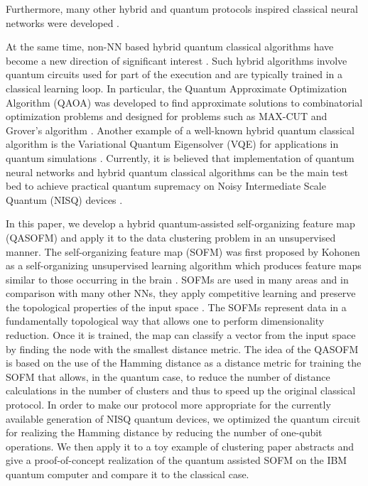 \documentclass[pra,showkeys,twocolumn,showpacs,aps,10pt]{revtex4-2}
\begin{document}
Furthermore, many other hybrid and quantum protocols inspired classical neural networks were developed  \cite{kolleQuantumDenoisingDiffusion2024,li2019, Heese2022,killoran2019,bondarenko2019,dunjko2017,nautrup2019,foesel2018, rebentrost2018,purushothaman1997,verdon2019,cherny2019,byrnes2013,mishra2019, pyrkov2019, vinci2019, lu2019,mohseni2023deep,mohseni2024deep}.

At the same time, non-NN based hybrid quantum classical algorithms have become a new direction of significant interest \cite{mcclean2016,arute2020,akshay2020}.
Such hybrid algorithms involve quantum circuits used for part of the execution and are typically trained in a classical learning loop.
In particular, the Quantum Approximate Optimization Algorithm (QAOA) was developed to find approximate solutions to combinatorial optimization problems \cite{farhi2014,farhi2016}
and designed for problems such as MAX-CUT and Grover's algorithm \cite{arute2020,akshay2020,wang2018,jiang2017,huang2019,wecker2016,pagano2019,byrnes2018,liao2021quadratic}.
Another example of a well-known hybrid quantum classical algorithm is the Variational Quantum Eigensolver (VQE) for applications in quantum simulations
\cite{kandala2017,aspuru-guzik2005,lanyon2010,peruzzo2014}.
Currently, it is believed that implementation of quantum neural networks and hybrid quantum classical algorithms can be the main test bed to achieve practical quantum supremacy on Noisy Intermediate Scale Quantum (NISQ) devices \cite{preskill2018,Bharti2022,Cerezo2021}.

In this paper, we develop a hybrid quantum-assisted self-organizing feature map (QASOFM)
and apply it to the data clustering problem in an unsupervised manner. The self-organizing feature map (SOFM) was first proposed by Kohonen \cite{kohonen1990,kohonen1996,kohonen1997} as a self-organizing unsupervised learning algorithm which produces feature maps similar to those occurring in the brain \cite{solan2001}. SOFMs are used in many areas \cite{vilibic2016, guido1998, doszkocs1990, jones2012,mori2019,corsello2017,zhu2018,chea2016}
and in comparison with many other NNs, they apply competitive learning and preserve the topological properties of the input space \cite{kiviluotoa1996}.
The SOFMs represent data in a fundamentally topological way that allows one to perform dimensionality reduction.
Once it is trained, the map can classify a vector from the input space by finding the node with the smallest distance metric. The idea of the QASOFM is based on the use of the Hamming distance as a distance metric for training the SOFM that allows, in the quantum case, to reduce the number of distance calculations in the number of clusters and thus to speed up the original classical protocol.
In order to make our protocol more appropriate for the currently available generation of NISQ quantum devices, we optimized the quantum circuit for realizing the Hamming distance by reducing the number of one-qubit operations. We then apply it to a toy example of clustering paper abstracts and give a proof-of-concept realization of the quantum assisted SOFM on the IBM quantum computer \cite{ibmq}
and compare it to the classical case.
\end{document}
